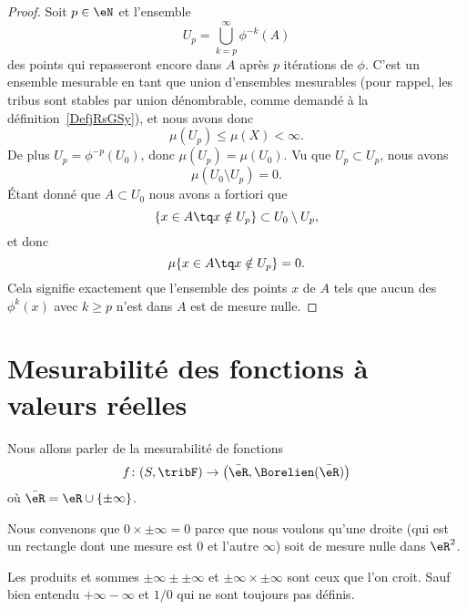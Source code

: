 \begin{proof}
	Soit \( p\in \eN\) et l'ensemble
	\begin{equation}
		U_p=\bigcup_{k=p}^{\infty}\phi^{-k}(A)
	\end{equation}
	des points qui repasseront encore dans \( A\) après \( p\) itérations  de \( \phi\). C'est un ensemble mesurable en tant que union d'ensembles mesurables (pour rappel, les tribus sont stables par union dénombrable, comme demandé à la définition~\ref{DefjRsGSy}), et nous avons donc
	\begin{equation}
		\mu(U_p)\leq \mu(X)<\infty.
	\end{equation}
	De plus \( U_p=\phi^{-p}(U_0)\), donc \( \mu(U_p)=\mu(U_0)\). Vu que \( U_p\subset U_p\), nous avons
	\begin{equation}
		\mu(U_0\setminus U_p)=0.
	\end{equation}
	Étant donné que \( A\subset U_0\) nous avons a fortiori que
	\begin{equation}
		\{ x\in A\tq x\notin U_p \}\subset U_0\setminus U_p,
	\end{equation}
	et donc
	\begin{equation}
		\mu\{ x\in A\tq x\notin U_p \}=0.
	\end{equation}
	Cela signifie exactement que l'ensemble des points \( x\) de \( A\) tels que aucun des \( \phi^k(x)\) avec \( k\geq p\) n'est dans \( A\) est de mesure nulle.
\end{proof}

\section{Mesurabilité des fonctions à valeurs réelles}

Nous allons parler de la mesurabilité de fonctions
\begin{equation}
	f\colon (S,\tribF)\to \big( \bar \eR,\Borelien(\bar \eR) \big)
\end{equation}
où \( \bar \eR=\eR\cup\{ \pm\infty \}\).

\begin{normaltext}      \label{normooGAAJooUPCbzG}
	Nous convenons que \( 0\times\pm\infty=0\) parce que nous voulons qu'une droite (qui est un rectangle dont une mesure est \( 0\) et l'autre \( \infty\)) soit de mesure nulle dans \( \eR^2\).

	Les produits et sommes \( \pm\infty\pm\pm\infty\) et \( \pm\infty\times \pm\infty\) sont ceux que l'on croit. Sauf bien entendu \( +\infty-\infty\) et \( 1/0\) qui ne sont toujours pas définis.
\end{normaltext}

